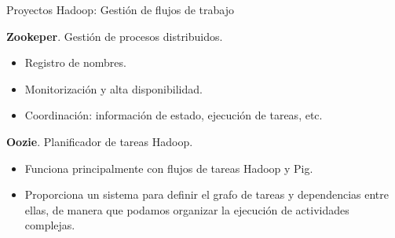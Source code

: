 
\begin{frame}{Proyectos Hadoop: Gestión de flujos de trabajo}

     \begin{wideitemize}
      \item \textbf{Zookeper}. Gestión de procesos distribuidos.
      \begin{itemize}
       \item Registro de nombres.
       \item Monitorización y alta disponibilidad.
       \item Coordinación: información de estado, ejecución de tareas, etc.
      \end{itemize}
      
      \item \textbf{Oozie}. Planificador de tareas Hadoop.
      \begin{itemize}
       \item Funciona principalmente con flujos de tareas Hadoop y Pig.
       \item Proporciona un sistema para definir el grafo de tareas y dependencias
       entre ellas, de manera que podamos organizar la ejecución de actividades
       complejas.
      \end{itemize}

    \end{wideitemize}

\end{frame}


